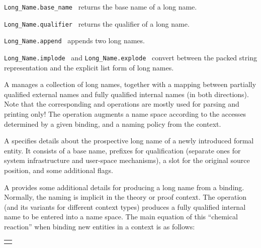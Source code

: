 \begin{isabellebody}
\begin{isamarkuptext}
\begin{description}
  \item \verb|Long_Name.base_name|~ returns the base name
  of a long name.

  \item \verb|Long_Name.qualifier|~ returns the qualifier
  of a long name.

  \item \verb|Long_Name.append|~ appends two long
  names.

  \item \verb|Long_Name.implode|~ and \verb|Long_Name.explode|~ convert between the packed string
  representation and the explicit list form of long names.

  \end{description}%
\end{isamarkuptext}%
\isamarkuptrue%
%
\endisatagmlref
{\isafoldmlref}%
%
\isadelimmlref
%
\endisadelimmlref
%
\isamarkuptrue%
%
\begin{isamarkuptext}%
A  manages a collection of long names,
  together with a mapping between partially qualified external names
  and fully qualified internal names (in both directions).  Note that
  the corresponding  and  operations
  are mostly used for parsing and printing only!  The  operation augments a name space according to the accesses
  determined by a given binding, and a naming policy from the context.

  \medskip A  specifies details about the prospective
  long name of a newly introduced formal entity.  It consists of a
  base name, prefixes for qualification (separate ones for system
  infrastructure and user-space mechanisms), a slot for the original
  source position, and some additional flags.

  \medskip A  provides some additional details for
  producing a long name from a binding.  Normally, the naming is
  implicit in the theory or proof context.  The 
  operation (and its variants for different context types) produces a
  fully qualified internal name to be entered into a name space.  The
  main equation of this ``chemical reaction'' when binding new
  entities in a context is as follows:

  \smallskip
  \begin{tabular}{l}
  \isa{binding\ {\isacharplus}\ naming\ {\isasymlongrightarrow}\ long\ name\ {\isacharplus}\ name\ space\ accesses}
  \end{tabular}
  \smallskip


\end{isamarkuptext}
\end{isabellebody}
